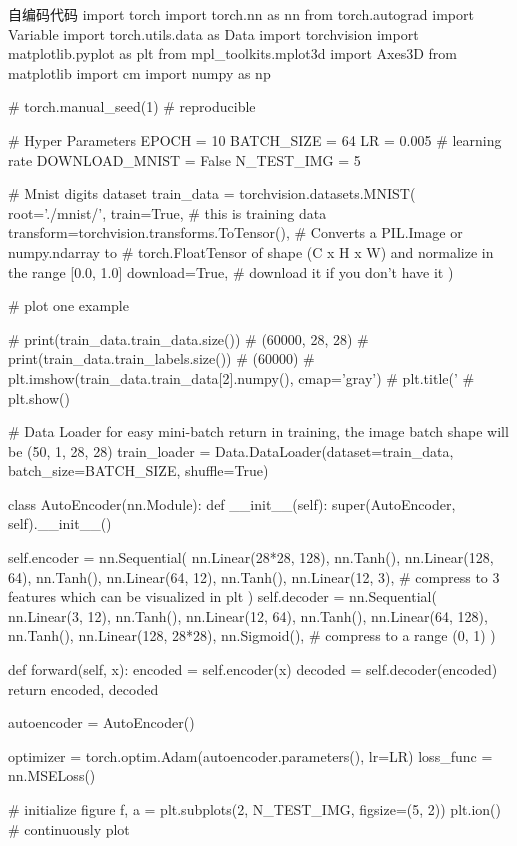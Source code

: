\documentclass[openbib]{article}
\begin{document}
\begin{Python}{自编码代码}
import torch
import torch.nn as nn
from torch.autograd import Variable
import torch.utils.data as Data
import torchvision
import matplotlib.pyplot as plt
from mpl_toolkits.mplot3d import Axes3D
from matplotlib import cm
import numpy as np

# torch.manual_seed(1)    # reproducible

# Hyper Parameters
EPOCH = 10
BATCH_SIZE = 64
LR = 0.005         # learning rate
DOWNLOAD_MNIST = False
N_TEST_IMG = 5

# Mnist digits dataset
train_data = torchvision.datasets.MNIST(
root='./mnist/',
train=True,                                     # this is training data
transform=torchvision.transforms.ToTensor(),    # Converts a PIL.Image or numpy.ndarray to
# torch.FloatTensor of shape (C x H x W) and normalize in the range [0.0, 1.0]
download=True,                                  # download it if you don't have it
)

# plot one example

# print(train_data.train_data.size())     # (60000, 28, 28)
# print(train_data.train_labels.size())   # (60000)
# plt.imshow(train_data.train_data[2].numpy(), cmap='gray')
# plt.title('%
# plt.show()

# Data Loader for easy mini-batch return in training, the image batch shape will be (50, 1, 28, 28)
train_loader = Data.DataLoader(dataset=train_data, batch_size=BATCH_SIZE, shuffle=True)

class AutoEncoder(nn.Module):
	def __init__(self):
	super(AutoEncoder, self).__init__()

	self.encoder = nn.Sequential(
	nn.Linear(28*28, 128),
	nn.Tanh(),
	nn.Linear(128, 64),
	nn.Tanh(),
	nn.Linear(64, 12),
	nn.Tanh(),
	nn.Linear(12, 3),   # compress to 3 features which can be visualized in plt
	)
	self.decoder = nn.Sequential(
	nn.Linear(3, 12),
	nn.Tanh(),
	nn.Linear(12, 64),
	nn.Tanh(),
	nn.Linear(64, 128),
	nn.Tanh(),
	nn.Linear(128, 28*28),
	nn.Sigmoid(),       # compress to a range (0, 1)
	)

	def forward(self, x):
	encoded = self.encoder(x)
	decoded = self.decoder(encoded)
	return encoded, decoded

autoencoder = AutoEncoder()

optimizer = torch.optim.Adam(autoencoder.parameters(), lr=LR)
loss_func = nn.MSELoss()

# initialize figure
f, a = plt.subplots(2, N_TEST_IMG, figsize=(5, 2))
plt.ion()   # continuously plot


\end{Python}
\end{document}
